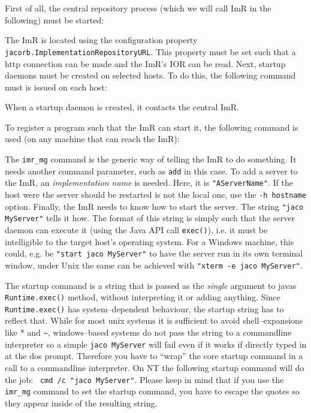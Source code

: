 \documentclass[12pt]{scrbook}
\begin{document}
First of all, the central repository process (which we will call ImR
in the following) must be started:


The   ImR   is  located   using   the   configuration  property   {\tt
jacorb.ImplementationRepositoryURL}.  This property  must be  set such
that  a  http  connection  can  be  made and  the  ImR's  IOR  can  be
read. Next, startup  daemons must be created on  selected hosts. To do
this, the following command must is issued on each host:


When a startup  daemon is created, it contacts  the central ImR.

To register  a program such that  the ImR can start  it, the following
command is used (on any machine that can reach the ImR):


The {\tt imr\_mg} command is the  generic way of telling the ImR to do
something. It  needs another command  parameter, such as {\tt  add} in
this case. To add a server to the ImR, an {\em implementation name} is
needed. Here, it is {\tt  "AServerName"}.  If the host were the server
should be  restarted is not the  local one, use the  {\tt -h hostname}
option.  Finally, the  ImR needs to know how to  start the server. The
string {\tt "jaco  MyServer"} tells it how. The  format of this string
is simply such  that the server daemon can execute  it (using the Java
API call  {\tt exec()}), i.e.  it  must be intelligible  to the target
host's operating system.   For a Windows machine, this  could, e.g. be
{\tt "start jaco MyServer"} to have the server run in its own terminal
window, under Unix  the same can be achieved with  {\tt "xterm -e jaco
MyServer"}.

The startup  command is a  string that is  passed as the  {\em single}
argument to javas {\tt Runtime.exec()} method, without interpreting it
or adding  anything. Since {\tt  Runtime.exec()} has system--dependent
behaviour, the startup string has to reflect that. While for most unix
systems  it  is  sufficient  to  avoid shell--expansions  like  *  and
\verb+~+,  windows--based  systems  do   not  pass  the  string  to  a
commandline interpreter so a simple {\tt jaco MyServer} will fail even
if it works if directly typed in at the dos prompt. Therefore you have
to  ``wrap'' the  core  startup command  in  a call  to a  commandline
interpreter. On NT the following startup command will do the job: {\tt
cmd /c "jaco MyServer"}.  Please keep in mind that if you use the {\tt
imr\_mg} command  to set the startup  command, you have  to escape the
quotes so they appear inside of the resulting string.
\end{document}
